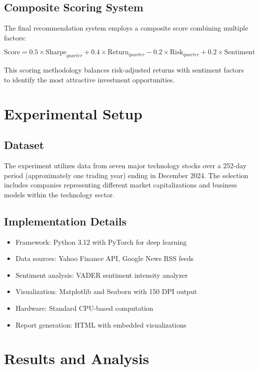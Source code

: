 \documentclass[12pt,a4paper]{article}
\begin{document}
\subsection{Composite Scoring System}

The final recommendation system employs a composite score combining multiple factors:

\begin{equation}
\text{Score} = 0.5 \times \text{Sharpe}_{quarter} + 0.4 \times \text{Return}_{quarter} - 0.2 \times \text{Risk}_{quarter} + 0.2 \times \text{Sentiment}
\end{equation}

This scoring methodology balances risk-adjusted returns with sentiment factors to identify the most attractive investment opportunities.

\section{Experimental Setup}

\subsection{Dataset}
The experiment utilizes data from seven major technology stocks over a 252-day period (approximately one trading year) ending in December 2024. The selection includes companies representing different market capitalizations and business models within the technology sector.

\subsection{Implementation Details}
\begin{itemize}
\item Framework: Python 3.12 with PyTorch for deep learning
\item Data sources: Yahoo Finance API, Google News RSS feeds
\item Sentiment analysis: VADER sentiment intensity analyzer
\item Visualization: Matplotlib and Seaborn with 150 DPI output
\item Hardware: Standard CPU-based computation
\item Report generation: HTML with embedded visualizations
\end{itemize}


\section{Results and Analysis}
\end{document}
